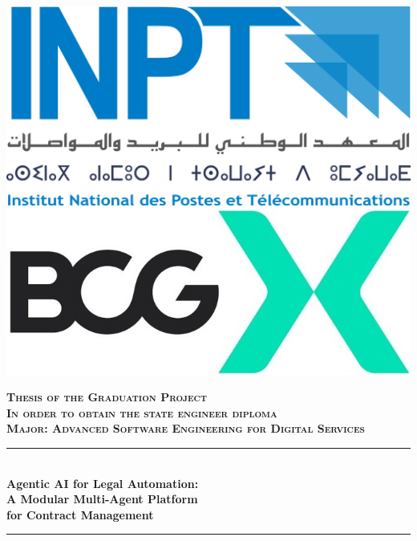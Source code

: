 \begin{titlepage}
  \thispagestyle{empty}
  
  \vspace{0.7cm}

  \includegraphics[scale=0.1]{Images/Logo_inpt.png} 
  \hfill 
  \includegraphics[scale=0.45]{Images/BCG_X.jpg}

  \vspace{0.7cm}
  \begin{center}
  {\large \textsc{\textbf{Thesis of the Graduation Project}}}\\[0.1cm]
  {\large \textsc{\textbf{In order to obtain the state engineer diploma}}}\\[0.1cm]
  {\large \textsc{\textbf{Major: \textbf{Advanced Software Engineering for Digital Services}}}} \\[0.1cm]
  \vspace{0.7cm}

  \rule{\linewidth}{0.3mm} \\[0.6cm]   %
  {\huge \textbf{Agentic AI for Legal Automation:} \\[0.2cm] \vspace{0.1cm} \textbf{A Modular Multi-Agent Platform} \\[0.3cm] \vspace{0.15cm} \textbf{for Contract Management}}\\ [0.6cm]
  \rule{\linewidth}{0.4mm} \\[0.4cm]
  \vspace{1.6cm}


\end{center}
\end{titlepage}
